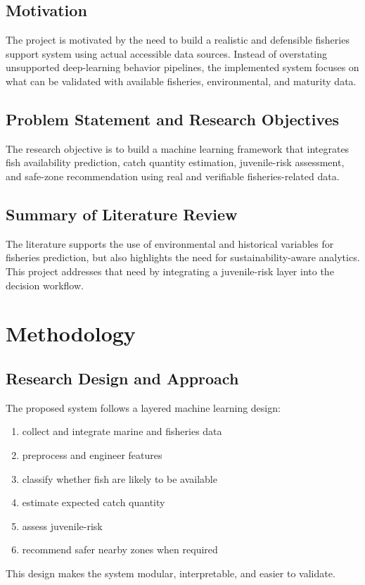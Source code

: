 \documentclass[12pt,a4paper]{report}
\begin{document}
\section{Motivation}
The project is motivated by the need to build a realistic and defensible fisheries support system using actual accessible data sources. Instead of overstating unsupported deep-learning behavior pipelines, the implemented system focuses on what can be validated with available fisheries, environmental, and maturity data.

\section{Problem Statement and Research Objectives}
The research objective is to build a machine learning framework that integrates fish availability prediction, catch quantity estimation, juvenile-risk assessment, and safe-zone recommendation using real and verifiable fisheries-related data.

\section{Summary of Literature Review}
The literature supports the use of environmental and historical variables for fisheries prediction, but also highlights the need for sustainability-aware analytics. This project addresses that need by integrating a juvenile-risk layer into the decision workflow.

\chapter{Methodology}

\section{Research Design and Approach}
The proposed system follows a layered machine learning design:
\begin{enumerate}[leftmargin=1.5cm]
    \item collect and integrate marine and fisheries data
    \item preprocess and engineer features
    \item classify whether fish are likely to be available
    \item estimate expected catch quantity
    \item assess juvenile-risk
    \item recommend safer nearby zones when required
\end{enumerate}
This design makes the system modular, interpretable, and easier to validate.
\end{document}
